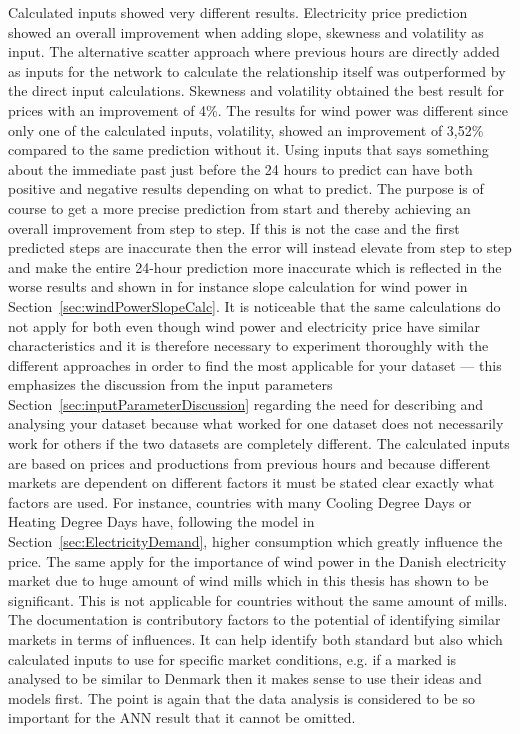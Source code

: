 Calculated inputs showed very different results. Electricity price prediction showed an overall improvement when adding slope, skewness and volatility as input. The alternative scatter approach where previous hours are directly added as inputs for the network to calculate the relationship itself was outperformed by the direct input calculations. Skewness and volatility obtained the best result for prices with an improvement of 4\%. The results for wind power was different since only one of the calculated inputs, volatility, showed an improvement of 3,52\% compared to the same prediction without it. Using inputs that says something about the immediate past just before the 24 hours to predict can have both positive and negative results depending on what to predict. The purpose is of course to get a more precise prediction from start and thereby achieving an overall improvement from step to step. If this is not the case and the first predicted steps are inaccurate then the error will instead elevate from step to step and make the entire 24-hour prediction more inaccurate which is reflected in the worse results and shown in for instance slope calculation for wind power in Section~\ref{sec:windPowerSlopeCalc}. It is noticeable that the same calculations do not apply for both even though wind power and electricity price have similar characteristics and it is therefore necessary to experiment thoroughly with the different approaches in order to find the most applicable for your dataset --- this emphasizes the discussion from the input parameters Section~\ref{sec:inputParameterDiscussion} regarding the need for describing and analysing your dataset because what worked for one dataset does not necessarily work for others if the two datasets are completely different. The calculated inputs are based on prices and productions from previous hours and because different markets are dependent on different factors  it must be stated clear exactly what factors are used. For instance, countries with many Cooling Degree Days or Heating Degree Days have, following the model in Section~\ref{sec:ElectricityDemand}, higher consumption which greatly influence the price. The same apply for the importance of wind power in the Danish electricity market due to huge amount of wind mills which in this thesis has shown to be significant. This is not applicable for countries without the same amount of mills. The documentation is contributory factors to the potential of identifying similar markets in terms of influences. It can help identify both standard but also which calculated inputs to use for specific market conditions, e.g. if a marked is analysed to be similar to Denmark then it makes sense to use their ideas and models first. The point is again that the data analysis is considered to be so important for the ANN result that it cannot be omitted. 

